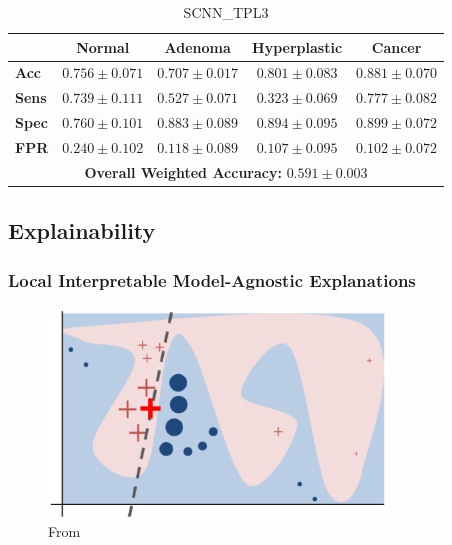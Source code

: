 \begin{table}[ht] \centering \caption{SCNN\_TPL3} \label{tab:scnn_tpl3}
\begin{tabular}{lcccc} \toprule & \textbf{Normal} & \textbf{Adenoma} &
\textbf{Hyperplastic} & \textbf{Cancer} \\ \midrule \textbf{Acc} & $0.756\pm0.
071$ & $0.707\pm0.017$ & $0.801\pm0.083$ & $0.881\pm0.070$ \\ \textbf{Sens} & $0.
739\pm0.111$ & $0.527\pm0.071$ & $0.323\pm0.069$ & $0.777\pm0.082$ \\
\textbf{Spec} & $0.760\pm0.101$ & $0.883\pm0.089$ & $0.894\pm0.095$ & $0.899\pm0.
072$ \\ \textbf{FPR} & $0.240\pm0.102$ & $0.118\pm0.089$ & $0.107\pm0.095$ & $0.
102\pm0.072$ \\ \midrule \multicolumn{5}{c}{\textbf{Overall Weighted Accuracy:}
$0.591\pm0.003$} \\ \bottomrule \end{tabular} \end{table}


\subsection{Explainability}
\subsubsection{Local Interpretable Model-Agnostic Explanations}
\begin{figure}[htbp]
  \centering
  \includegraphics[width=0.8\textwidth]{Images/lime_explanation.png}
  \caption{From \cite{ribeiro_why_2016}}
  \label{fig:my-label}
\end{figure}

